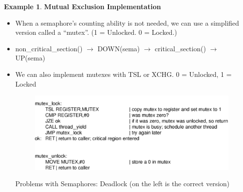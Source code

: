 \documentclass[12pt,a4paper]{article}
\theoremstyle{definition}
\newtheorem{example}{Example}[section]
\newenvironment{myitemize}
{ \begin{itemize}
    \setlength{\itemsep}{5pt}
    \setlength{\parskip}{0pt}
    \setlength{\parsep}{0pt}     }
{ \end{itemize}                  }
\begin{document}
\begin{example}{\textbf{Mutual Exclusion Implementation}}
\begin{myitemize}
\begin{myitemize}
\begin{myitemize}
				\item UP, POST, GIVE or V: If there are any processes blocking on a DOWN, one is selected and woken up. Otherwise UP increments the semaphore and returns.
			\end{myitemize}
			\item When a semaphore’s counting ability is not needed, we can use a simplified version called a “mutex”. (1 = Unlocked. 0 = Locked.)
			\item non\_critical\_section() $\rightarrow$ DOWN(sema) $\rightarrow$ critical\_section() $\rightarrow$ UP(sema)
			\item We can also implement mutexes with \textsf{TSL} or \textsf{XCHG}. 0 = Unlocked, 1 = Locked
			\begin{figure}[!h]
				\includegraphics[scale=0.35]{m1/mutexWithTSL}
				\centering
			\end{figure}
			\begin{tcolorbox}
				\textsf{Problems with Semaphores: Deadlock} (on the left is the correct version)
				

\end{tcolorbox}
\end{myitemize}
\end{myitemize}
\end{example}
\end{document}

